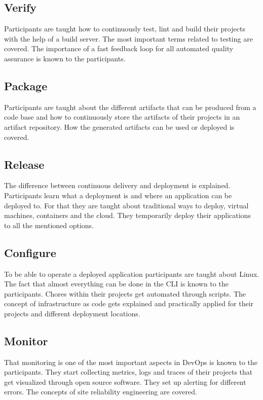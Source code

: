 \documentclass{article}
\begin{document}
\subsection{Verify}

Participants are taught how to continuously test, lint and build their
projects with the help of a build server. The most important terms related
to testing are covered. The importance of a fast feedback loop for all automated
quality assurance is known to the participants.

\subsection{Package}

Participants are taught about the different artifacts that can be produced from
a code base and how to continuously store the artifacts of their projects in an
artifact repository. How the generated artifacts can be used or deployed is
covered.

\subsection{Release}

The difference between continuous delivery and deployment is explained.
Participants learn what a deployment is and where an application can be deployed
to. For that they are taught about traditional ways to deploy, virtual machines,
containers and the cloud. They temporarily deploy their applications to all the
mentioned options.

\subsection{Configure}

To be able to operate a deployed application participants are taught about
Linux. The fact that almost everything can be done in the CLI is known to the
participants. Chores within their projects get automated through scripts. The
concept of infrastructure as code gets explained and practically applied for
their projects and different deployment locations.

\subsection{Monitor}

That monitoring is one of the most important aspects in DevOps is known to
the participants. They start collecting metrics, logs and traces of their
projects that get visualized through open source software. They set up alerting
for different errors. The concepts of site reliability engineering are covered.
\end{document}
